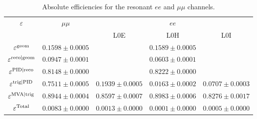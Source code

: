 \begin{table}[h!]
\centering
\caption{Absolute efficiencies for the resonant $ee$ and $\mu\mu$ channels.}
\begin{tabular}{c|c|c|c|c}
\multirow{2}{*}{$\varepsilon$} 	&  $\mu\mu$ 	& \multicolumn {3}{c}{$ee$} \\ \cline{2-5}
	  & &  L0E 	& L0H 	& L0I \\ \hline
$\varepsilon^{\rm geom}$  & $ 0.1598  \pm  0.0005 $ & \multicolumn{3}{c}{$ 0.1589  \pm  0.0005 $} \\
$\varepsilon^{\rm reco|geom}$  & $ 0.0947  \pm  0.0001 $ & \multicolumn{3}{c}{$ 0.0603  \pm  0.0001 $} \\
$\varepsilon^{\rm PID|reco}$  & $ 0.8148  \pm  0.0000 $ & \multicolumn{3}{c}{$ 0.8222  \pm  0.0000 $} \\
\hline
$\varepsilon^{\rm trig|PID}$  & $ 0.7511  \pm  0.0005 $ & $ 0.1939  \pm  0.0005 $ & $ 0.0163  \pm  0.0002 $ & $ 0.0707  \pm  0.0003 $ \\
$\varepsilon^{\rm MVA|trig}$   & $ 0.8944  \pm  0.0004 $ & $ 0.8597  \pm  0.0007 $ & $ 0.8983  \pm  0.0006 $ & $ 0.8276  \pm  0.0017 $ \\
\hline
$\varepsilon^{\rm Total}$   & $ 0.0083  \pm  0.0000 $ & $ 0.0013  \pm  0.0000 $ & $ 0.0001  \pm  0.0000 $ & $ 0.0005  \pm  0.0000 $ \\
\end{tabular}
\label{tab:AbsEff_jpsi}
\end{table}


